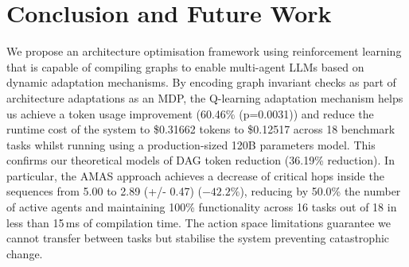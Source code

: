 \documentclass[conference]{IEEEtran}
\begin{document}
\section{Conclusion and Future Work}
\label{sec:conclusion}

We propose an architecture optimisation framework using reinforcement learning that is capable of compiling graphs to enable multi-agent LLMs based on dynamic adaptation mechanisms. By encoding graph invariant checks as part of architecture adaptations as an MDP, the Q-learning adaptation mechanism helps us achieve a token usage improvement (60.46\% (p=0.0031)) and reduce the runtime cost of the system to \$0.31662 tokens to \$0.12517 across 18 benchmark tasks whilst running using a production-sized 120B parameters model. This confirms our theoretical models of DAG token reduction (36.19\% reduction). In particular, the AMAS approach achieves a decrease of critical hops inside the sequences from 5.00 to 2.89 (+/- 0.47) ($-42.2\%$), reducing by 50.0\% the number of active agents and maintaining 100\% functionality across 16 tasks out of 18 in less than 15\,ms of compilation time. The action space limitations guarantee we cannot transfer between tasks but stabilise the system preventing catastrophic change.



\end{document}

